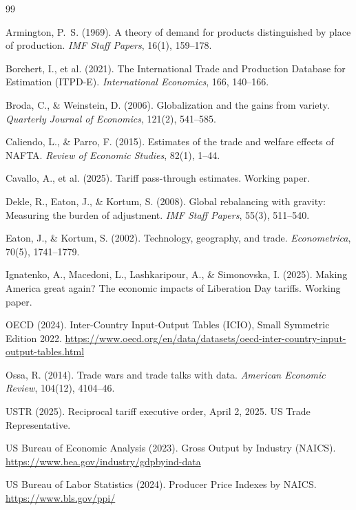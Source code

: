\documentclass[12pt]{article}
\begin{document}
\newpage

\begin{thebibliography}{99}

Armington, P.~S. (1969). A theory of demand for products distinguished by
place of production. \textit{IMF Staff Papers}, 16(1), 159--178.

Borchert, I., et al. (2021). The International Trade and Production Database
for Estimation (ITPD-E). \textit{International Economics}, 166, 140--166.

Broda, C., \& Weinstein, D. (2006). Globalization and the gains from variety.
\textit{Quarterly Journal of Economics}, 121(2), 541--585.

Caliendo, L., \& Parro, F. (2015). Estimates of the trade and welfare effects
of NAFTA. \textit{Review of Economic Studies}, 82(1), 1--44.

Cavallo, A., et al. (2025). Tariff pass-through estimates. Working paper.

Dekle, R., Eaton, J., \& Kortum, S. (2008). Global rebalancing with gravity:
Measuring the burden of adjustment. \textit{IMF Staff Papers}, 55(3), 511--540.

Eaton, J., \& Kortum, S. (2002). Technology, geography, and trade.
\textit{Econometrica}, 70(5), 1741--1779.

Ignatenko, A., Macedoni, L., Lashkaripour, A., \& Simonovska, I. (2025).
Making America great again? The economic impacts of Liberation Day tariffs.
Working paper.

OECD (2024). Inter-Country Input-Output Tables (ICIO), Small Symmetric
Edition 2022. \url{https://www.oecd.org/en/data/datasets/oecd-inter-country-input-output-tables.html}

Ossa, R. (2014). Trade wars and trade talks with data.
\textit{American Economic Review}, 104(12), 4104--46.

USTR (2025). Reciprocal tariff executive order, April 2, 2025.
US Trade Representative.

US Bureau of Economic Analysis (2023). Gross Output by Industry (NAICS).
\url{https://www.bea.gov/industry/gdpbyind-data}

US Bureau of Labor Statistics (2024). Producer Price Indexes by NAICS.
\url{https://www.bls.gov/ppi/}

\end{thebibliography}
\end{document}
